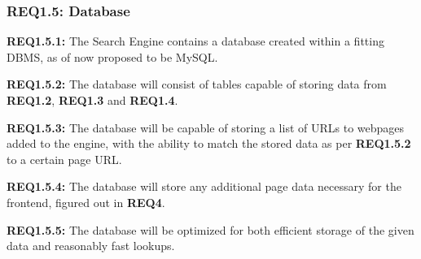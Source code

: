 \subsubsection{REQ1.5: Database}

\textbf{REQ1.5.1:} The Search Engine contains a database created within a fitting DBMS, as of now proposed to be MySQL.

\textbf{REQ1.5.2:} The database will consist of tables capable of storing data from \textbf{REQ1.2}, \textbf{REQ1.3} and \textbf{REQ1.4}.

\textbf{REQ1.5.3:} The database will be capable of storing a list of URLs to webpages added to the engine, with the ability to match the stored data as per \textbf{REQ1.5.2} to a certain page URL.

\textbf{REQ1.5.4:} The database will store any additional page data necessary for the frontend, figured out in \textbf{REQ4}.

\textbf{REQ1.5.5:} The database will be optimized for both efficient storage of the given data and reasonably fast lookups.

